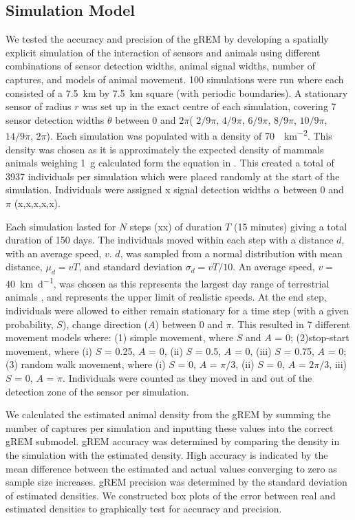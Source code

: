 \documentclass[a4paper,10pt,reqno,oneside]{amsart}
\begin{document}
\subsection{Simulation Model}

We tested the accuracy and precision of the gREM by developing a spatially explicit simulation of the interaction of sensors and animals using different combinations of sensor detection widths, animal signal widths, number of captures, and models of animal movement. 100 simulations were run where each consisted of a  \SI{7.5}{\kilo\meter} by \SI{7.5}{\kilo\meter} square (with periodic boundaries). A stationary sensor of radius $r$ was set up in the exact centre of each simulation, covering 7 sensor detection widths $\theta$ between 0 and $2\pi$( $2/9\pi$, $4/9\pi$, $6/9\pi$, $8/9\pi$, $10/9\pi$, $14/9\pi$, $2\pi$). Each simulation was populated with a density of \SI{70}{\animals\per\kilo\meter\squared}. This density was chosen as it is approximately the expected density of mammals animals weighing \SI{1}{\gram} calculated form the equation in \cite{damuth1981population}. This created a total of 3937 individuals per simulation which were placed randomly at the start of the simulation. Individuals were assigned x signal detection widths $\alpha$ between 0 and $\pi$ (x,x,x,x,x).

Each simulation lasted for $N$ steps (xx) of duration $T$ (15 minutes) giving a total duration of 150 days. The individuals moved within each step with a distance $d$, with an average speed, $v$. $d$, was sampled from a normal distribution with mean distance, $\mu_d = vT$, and standard deviation $\sigma_d = vT/10$. An average speed, $v = $ \SI{40}{\kilo\meter \per \day}, was chosen as this represents the largest day range of terrestrial animals \citep{carbone2005far}, and represents the upper limit of realistic speeds. At the end step, individuals were allowed to either remain stationary for a time step (with a given probability, $S$), change direction ($A$) between 0 and $\pi$. This resulted in 7 different movement models where: (1) simple movement, where $S$ and $A$ = 0; (2)stop-start movement, where (i) $S$ = 0.25, $A$ = 0, (ii) $S$ = 0.5, $A$ = 0, (iii) $S$ = 0.75, $A$ = 0; (3) random walk movement, where (i) $S$ = 0, $A$ = $\pi/3$, (ii) $S$ = 0, $A$ = $2\pi/3$, iii) $S$ = 0, $A$ = $\pi$.  
Individuals were counted as they moved in and out of the detection zone of the sensor per simulation. 

We calculated the estimated animal density from the gREM by summing the number of captures per simulation and inputting these values into the correct gREM submodel. gREM accuracy was determined by comparing the density in the simulation with the estimated density. High accuracy is indicated by the mean difference between the estimated and actual values converging to zero as sample size increases. gREM precision was determined by the standard deviation of estimated densities. We constructed box plots of the error between real and estimated densities to graphically test for accuracy and precision. 
\end{document}
